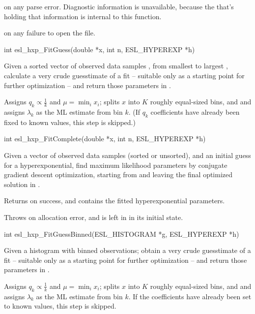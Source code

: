 \begin{sreapi}
 on any parse error. Diagnostic information is
unavailable, because the  that's holding 
that information is internal to this function. 

 on any failure to open the file.


\hypertarget{func:esl_hxp_FitGuess()}
{\item[int esl\_hxp\_FitGuess(double *x, int n, ESL\_HYPEREXP *h)]}

Given a sorted vector of  observed data samples ,
from smallest  to largest , calculate a
very crude guesstimate of a fit -- suitable only as a starting
point for further optimization -- and return those parameters
in .

Assigns $q_k \propto \frac{1}{k}$ and  $\mu = \min_i x_i$;
splits $x$ into $K$ roughly equal-sized bins, and
and assigns $\lambda_k$ as the ML estimate from bin $k$.
(If $q_k$ coefficients have already been fixed to 
known values, this step is skipped.)


\hypertarget{func:esl_hxp_FitComplete()}
{\item[int esl\_hxp\_FitComplete(double *x, int n, ESL\_HYPEREXP *h)]}

Given a vector of  observed data samples  
(sorted or unsorted), and an initial guess  for
a hyperexponential, find maximum likelihood parameters
by conjugate gradient descent optimization, starting
from  and leaving the final optimized solution in
.

Returns  on success, and  contains the fitted 
hyperexponential parameters.

Throws  on allocation error, and  is left in
in its initial state.           


\hypertarget{func:esl_hxp_FitGuessBinned()}
{\item[int esl\_hxp\_FitGuessBinned(ESL\_HISTOGRAM *g, ESL\_HYPEREXP *h)]}

Given a histogram  with binned observations;
obtain a very crude guesstimate of a fit -- suitable only 
as a starting point for further optimization -- and return 
those parameters in .

Assigns $q_k \propto \frac{1}{k}$ and  $\mu = \min_i x_i$;
splits $x$ into $K$ roughly equal-sized bins, and
and assigns $\lambda_k$ as the ML estimate from bin $k$.
If the coefficients have already been set to known values,
this step is skipped.



\end{sreapi}
